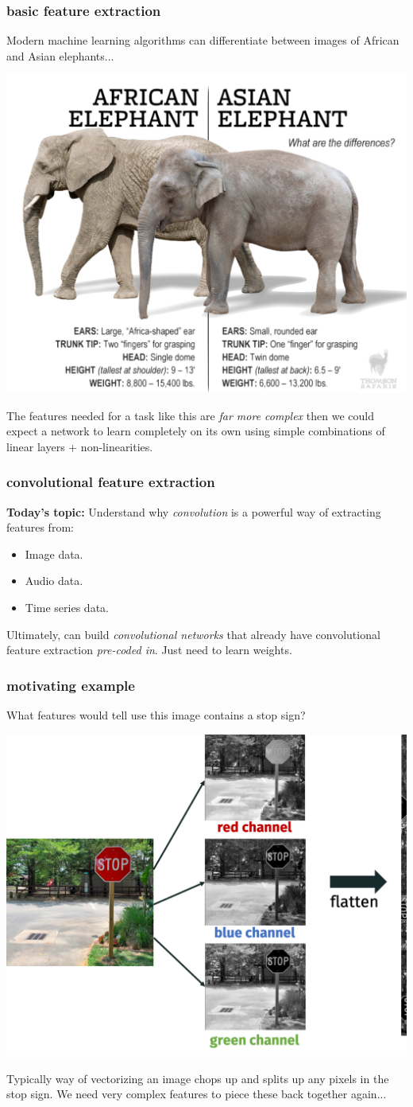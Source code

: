 \documentclass[handout,compress]{beamer}
\begin{document}
	\begin{frame}
	\frametitle{basic feature extraction}
	Modern machine learning algorithms can differentiate between images of African and Asian elephants...
	\begin{center}
		\includegraphics[width=.5\textwidth]{elephants.png}
	\end{center}
The features needed for a task like this are \emph{far more complex} then we could expect a network to learn completely on its own using simple combinations of linear layers + non-linearities. 
	\end{frame}

	\begin{frame}
	\frametitle{convolutional feature extraction}
	\textbf{Today's topic:} Understand why \emph{convolution} is a powerful way of extracting features from:
	\begin{itemize}
		\item Image data.
		\item Audio data.
		\item Time series data.
	\end{itemize}
	Ultimately, can build \emph{convolutional networks} that already have convolutional feature extraction \emph{pre-coded in}. Just need to learn weights. 
	\end{frame}

	\begin{frame}
	\frametitle{motivating example}
	What features would tell use this image contains a stop sign?
	\begin{center}
		\includegraphics[width=.6\textwidth]{stopsign_flat.png}
	\end{center}
Typically way of vectorizing an image chops up and splits up any pixels in the stop sign. We need very complex features to piece these back together again...
	\end{frame}
\end{document}
